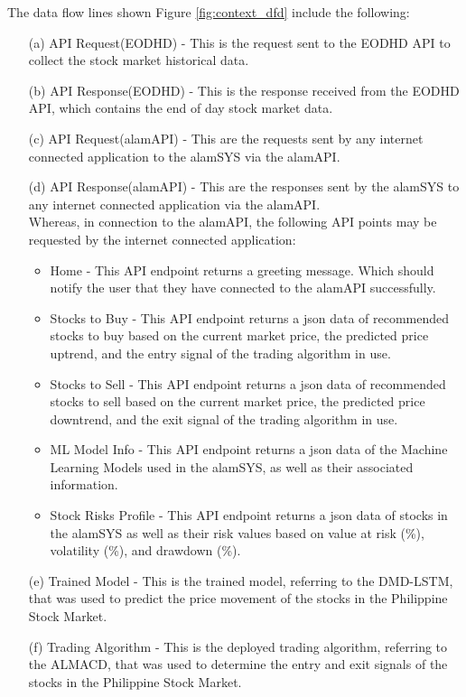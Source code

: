 The data flow lines shown Figure \ref{fig:context_dfd} include the following:
\begin{itemize}
    \item[(a)] API Request(EODHD) - This is the request sent to the EODHD API to collect the 
    stock market historical data.
    \item[(b)] API Response(EODHD) - This is the response received from the 
    EODHD API, which contains the end of day stock market data.
    \item[(c)] API Request(alamAPI) - This are the requests sent by any 
    internet connected application to the alamSYS via the alamAPI.
    \item[(d)] API Response(alamAPI) - This are the responses sent by the alamSYS to 
    any internet connected application via the alamAPI.
    \\ Whereas, in connection to the alamAPI, the following API points may be requested by the internet connected application:
    \begin{itemize}
        \item Home - This API endpoint returns a greeting message. Which should notify the 
        user that they have connected to the alamAPI successfully.
        \item Stocks to Buy - This API endpoint returns a json data of recommended stocks to 
        buy based on the current market price, the predicted price uptrend, and the entry signal of the
        trading algorithm in use.
        \item Stocks to Sell - This API endpoint returns a json data of recommended stocks to 
        sell based on the current market price, the predicted price downtrend, and the exit signal of the
        trading algorithm in use.
        \item ML Model Info - This API endpoint returns a json data of the Machine Learning Models 
        used in the alamSYS, as well as their associated information.
        \item Stock Risks Profile - This API endpoint returns a json data of stocks in the 
        alamSYS as well as their risk values based on value at risk (\%), volatility (\%), and drawdown (\%).
    \end{itemize}
    \item[(e)] Trained Model - This is the trained model, referring to the DMD-LSTM, that was used to predict the 
    price movement of the stocks in the Philippine Stock Market.
    \item[(f)] Trading Algorithm - This is the deployed trading algorithm, referring to the ALMACD,
    that was used to determine the entry and exit signals of the stocks in the Philippine Stock Market.
\end{itemize}

